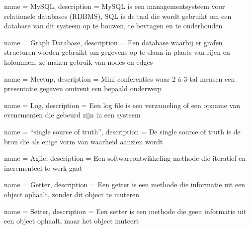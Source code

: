 


{
  name = MySQL,
  description = {MySQL is een managementsysteem voor relationele databases (\gls{RDBMS}), SQL is de taal die wordt gebruikt om een database van dit systeem op te bouwen, te bevragen en te onderhouden}
}

{
  name = {Graph Database},
  description = {Een database waarbij er grafen structuren worden gebruikt om gegevens op te slaan in plaats van rijen en kolommen, ze maken gebruik van nodes en edges}
}

{
  name = Meetup,
  description = {Mini conferenties waar 2 à 3-tal mensen een presentatie gegeven omtrent een bepaald onderwerp}
}

{
  name = Log,
  description = {Een log file is een verzameling of een opname van evenementen die gebeurd zijn in een systeem}
}

{
  name = ``single source of truth'',
  description = {De single source of truth is de bron die als enige vorm van waarheid aanzien wordt}
}

{
  name = Agile,
  description = {Een softwareontwikkeling methode die iteratief en incrementeel te werk gaat}
}

{
  name = Getter,
  description = {Een getter is een methode die informatie uit een object ophaalt, zonder dit object te muteren}
}

{
  name = Setter,
  description = {Een setter is een methode die geen informatie uit een object ophaalt, maar het object muteert}
}

